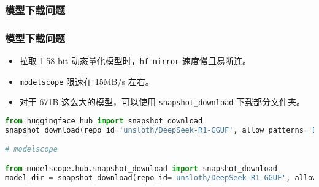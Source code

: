 \begin{frame}[fragile]
    \frametitle{模型下载问题}
    \subsubsection{模型下载问题}
    \begin{itemize}
        \item 拉取 1.58 bit 动态量化模型时，\texttt{hf mirror} 速度慢且易断连。
        \item \texttt{modelscope} 限速在 15MB/s 左右。
        \item 对于 671B 这么大的模型，可以使用 \texttt{snapshot\_download} 下载部分文件夹。
    \end{itemize}
    \begin{lstlisting}[language=python]
from huggingface_hub import snapshot_download
snapshot_download(repo_id='unsloth/DeepSeek-R1-GGUF', allow_patterns='DeepSeek-R1-UD-IQ1_S/*', cache_dir='./')

# modelscope

from modelscope.hub.snapshot_download import snapshot_download
model_dir = snapshot_download(repo_id='unsloth/DeepSeek-R1-GGUF', allow_patterns='DeepSeek-R1-UD-IQ1_S/*',cache_dir='./')
\end{lstlisting}
\end{frame}
